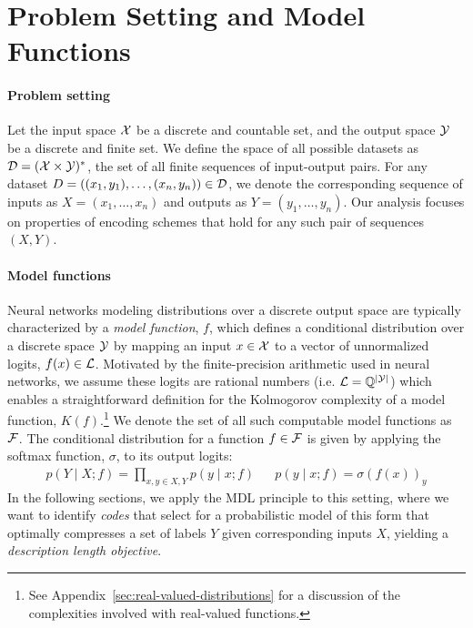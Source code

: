 
\vspace{-0.1cm}
\section{Problem Setting and Model Functions}
\label{sec:problem-setting}





\paragraph{Problem setting}
Let the input space ${\mathcal{X}}$ be a discrete and countable set, and the output space ${\mathcal{Y}}$ be a discrete and finite set. We define the space of all possible datasets as ${\mathcal{D}} = ({\mathcal{X}} \times {\mathcal{Y}})^*$, the set of all finite sequences of input-output pairs. For any dataset $D = ((x_1, y_1), \ldots, (x_n, y_n)) \in {\mathcal{D}}$, we denote the corresponding sequence of inputs as $X = (x_1, \ldots, x_n)$ and outputs as $Y = (y_1, \ldots, y_n)$. Our analysis focuses on properties of encoding schemes that hold for any such pair of sequences $(X,Y)$.

\vspace{-0.1cm}

\paragraph{Model functions}

Neural networks modeling distributions over a discrete output space are typically characterized by a \emph{model function}, $f$, which defines a conditional distribution over a discrete space ${\mathcal{Y}}$ by mapping an input $x \in {\mathcal{X}}$ to a vector of unnormalized logits, $f(x) \in {\mathcal{L}}$. Motivated by the finite-precision arithmetic used in neural networks, we assume these logits are rational numbers (i.e. ${\mathcal{L}} = \mathbb{Q}^{|{\mathcal{Y}}|}$) which enables a straightforward definition for the Kolmogorov complexity of a model function, $K(f)$.\footnote{See Appendix~\ref{sec:real-valued-distributions} for a discussion of the complexities involved with real-valued functions.}
We denote the set of all such computable model functions as ${\mathcal{F}}$. The conditional distribution for a function $f \in {\mathcal{F}}$ is given by applying the softmax function, $\sigma$, to its output logits:
\begin{align}
p(Y \mid X;f) = \prod_{x,y \in X,Y} p(y \mid x;f) &&
p(y \mid x;f) = \sigma(f(x))_y \label{eq:softmax}
\end{align}
In the following sections, we apply the MDL principle to this setting, where we want to identify \emph{codes} that select for a probabilistic model of this form that optimally compresses a set of labels $Y$ given corresponding inputs $X$, yielding a \emph{description length objective}.



